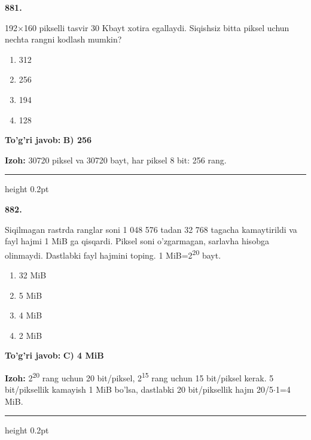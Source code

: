 \documentclass[10pt,a4paper,oneside]{article}
\begin{document}
\noindent\textbf{\color{ink}881.}
\par
192\ensuremath{\times}160 pikselli tasvir 30 Kbayt xotira egallaydi. Siqishsiz bitta piksel uchun nechta rangni kodlash mumkin?
\begin{enumerate}[label=\Alph*),leftmargin=9mm]
\item 312
\item 256
\item 194
\item 128
\end{enumerate}
\begin{tcolorbox}[enhanced,breakable,colback=teal!4,colframe=teal!50!black,boxrule=0.5pt,arc=1.1mm,left=3mm,right=3mm,top=1.7mm,bottom=1.7mm,before skip=2mm,after skip=2mm]
\textbf{\color{teal}To'g'ri javob:} \textbf{B) 256}
\par\smallskip
\textbf{Izoh:} 30720 piksel va 30720 bayt, har piksel 8 bit: 256 rang.
\end{tcolorbox}
\vspace{2mm}\hrule height 0.2pt \vspace{3mm}

\noindent\textbf{\color{ink}882.}
\par
Siqilmagan rastrda ranglar soni 1 048 576 tadan 32 768 tagacha kamaytirildi va fayl hajmi 1 MiB ga qisqardi. Piksel soni o'zgarmagan, sarlavha hisobga olinmaydi. Dastlabki fayl hajmini toping. 1 MiB=2\textsuperscript{2}\textsuperscript{0} bayt.
\begin{enumerate}[label=\Alph*),leftmargin=9mm]
\item 32 MiB
\item 5 MiB
\item 4 MiB
\item 2 MiB
\end{enumerate}
\begin{tcolorbox}[enhanced,breakable,colback=teal!4,colframe=teal!50!black,boxrule=0.5pt,arc=1.1mm,left=3mm,right=3mm,top=1.7mm,bottom=1.7mm,before skip=2mm,after skip=2mm]
\textbf{\color{teal}To'g'ri javob:} \textbf{C) 4 MiB}
\par\smallskip
\textbf{Izoh:} 2\textsuperscript{2}\textsuperscript{0} rang uchun 20 bit/piksel, 2\textsuperscript{1}\textsuperscript{5} rang uchun 15 bit/piksel kerak. 5 bit/piksellik kamayish 1 MiB bo'lsa, dastlabki 20 bit/piksellik hajm 20/5\ensuremath{\cdot}1=4 MiB.
\end{tcolorbox}
\vspace{2mm}\hrule height 0.2pt \vspace{3mm}
\end{document}
